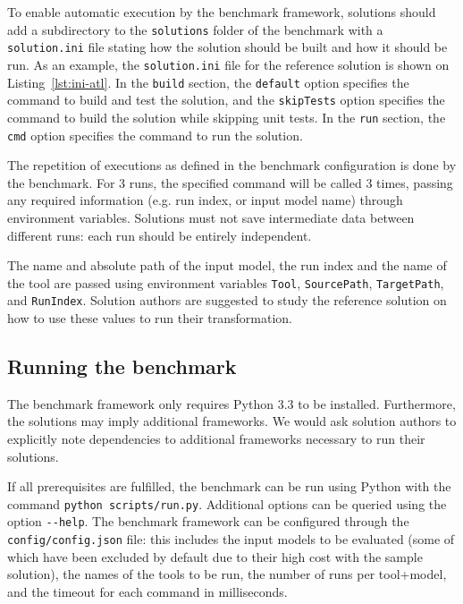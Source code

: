 \documentclass[
twocolumn,
]{ceurart}
\newcommand*{\file}[1]{\texttt{#1}}
\begin{document}


To enable automatic execution by the benchmark framework, solutions should add a
subdirectory to the \file{solutions} folder of the benchmark with a
\file{solution.ini} file stating how the solution should be built and how it
should be run. As an example, the \file{solution.ini} file for the reference
solution is shown on Listing~\ref{lst:ini-atl}. In the \file{build} section, the
\file{default} option specifies the command to build and test the solution, and
the \file{skipTests} option specifies the command to build the solution while
skipping unit tests. In the \file{run} section, the \file{cmd} option specifies
the command to run the solution.

The repetition of executions as defined in the benchmark configuration is done
by the benchmark. For 3 runs, the specified command will be called 3 times,
passing any required information (e.g. run index, or input model name) through
environment variables. Solutions must not save intermediate data between
different runs: each run should be entirely independent.

The name and absolute path of the input model, the run index and the name of the
tool are passed using environment variables \file{Tool}, \file{SourcePath},
\file{TargetPath}, and \file{RunIndex}.
Solution authors are suggested to study the reference solution on how to use
these values to run their transformation.

\subsection{Running the benchmark}
\label{sec:running-benchmark}

The benchmark framework only requires Python 3.3 to be installed. Furthermore,
the solutions may imply additional frameworks. We would ask solution authors to
explicitly note dependencies to additional frameworks necessary to run their
solutions.

If all prerequisites are fulfilled, the benchmark can be run using Python with
the command \file{python scripts/run.py}. Additional options can be queried
using the option \file{{-}{-}help}. The benchmark framework can be configured
through the \file{config/config.json} file: this includes the input models to be
evaluated (some of which have been excluded by default due to their high cost
with the sample solution), the names of the tools to be run, the number of runs
per tool+model, and the timeout for each command in milliseconds.
\end{document}
